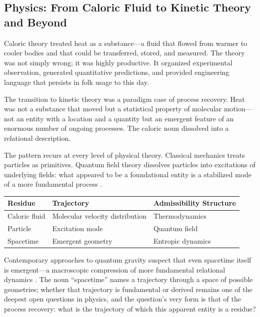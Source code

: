 \documentclass[12pt, a4paper]{article}
\theoremstyle{plain}
\theoremstyle{definition}
\theoremstyle{remark}
\begin{document}
\subsection{Physics: From Caloric Fluid to Kinetic Theory and Beyond}

Caloric theory treated heat as a substance---a fluid that flowed from warmer
to cooler bodies and that could be transferred, stored, and measured. The
theory was not simply wrong; it was highly productive. It organized
experimental observation, generated quantitative predictions, and provided
engineering language that persists in folk usage to this day.

The transition to kinetic theory \citep{maxwell1860,boltzmann1872} was a
paradigm case of process recovery. Heat was not a substance that moved but
a statistical property of molecular motion---not an entity with a location
and a quantity but an emergent feature of an enormous number of ongoing
processes. The caloric noun dissolved into a relational description.

The pattern recurs at every level of physical theory. Classical mechanics
treats particles as primitives. Quantum field theory dissolves particles
into excitations of underlying fields: what appeared to be a foundational
entity is a stabilized mode of a more fundamental process \citep{weinberg1995}.

\begin{center}
\begin{tabular}{lll}
\toprule
\textbf{Residue} & \textbf{Trajectory} & \textbf{Admissibility Structure} \\
\midrule
Caloric fluid & Molecular velocity distribution & Thermodynamics \\
Particle & Excitation mode & Quantum field \\
Spacetime & Emergent geometry & Entropic dynamics \citep{verlinde2011} \\
\bottomrule
\end{tabular}
\end{center}

Contemporary approaches to quantum gravity suspect that even spacetime itself
is emergent---a macroscopic compression of more fundamental relational dynamics
\citep{jacobson1995}. The noun ``spacetime'' names a trajectory through a
space of possible geometries; whether that trajectory is fundamental or derived
remains one of the deepest open questions in physics, and the question's very
form is that of the process recovery: what is the trajectory of which this
apparent entity is a residue?
\end{document}

